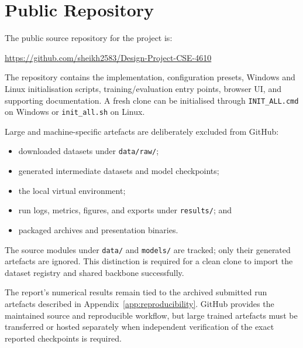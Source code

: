 \chapter{Public Repository}\label{app:github}

The public source repository for the project is:

\begin{center}
\url{https://github.com/sheikh2583/Design-Project-CSE-4610}
\end{center}

The repository contains the implementation, configuration presets, Windows and
Linux initialisation scripts, training/evaluation entry points, browser UI, and
supporting documentation. A fresh clone can be initialised through
\texttt{INIT\_ALL.cmd} on Windows or \texttt{init\_all.sh} on Linux.

Large and machine-specific artefacts are deliberately excluded from GitHub:

\begin{itemize}
  \item downloaded datasets under \texttt{data/raw/};
  \item generated intermediate datasets and model checkpoints;
  \item the local virtual environment;
  \item run logs, metrics, figures, and exports under \texttt{results/}; and
  \item packaged archives and presentation binaries.
\end{itemize}

The source modules under \texttt{data/} and \texttt{models/} are tracked; only
their generated artefacts are ignored. This distinction is required for a clean
clone to import the dataset registry and shared backbone successfully.

The report's numerical results remain tied to the archived submitted run
artefacts described in Appendix~\ref{app:reproducibility}. GitHub provides the
maintained source and reproducible workflow, but large trained artefacts must be
transferred or hosted separately when independent verification of the exact
reported checkpoints is required.
